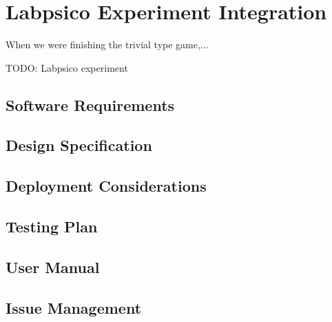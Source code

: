 \section{Labpsico Experiment Integration}

When we were finishing the trivial type game,...

TODO: Labpsico experiment

\subsection{Software Requirements}

\subsection{Design Specification}

\subsection{Deployment Considerations}

\subsection{Testing Plan}

\subsection{User Manual}

\subsection{Issue Management}
